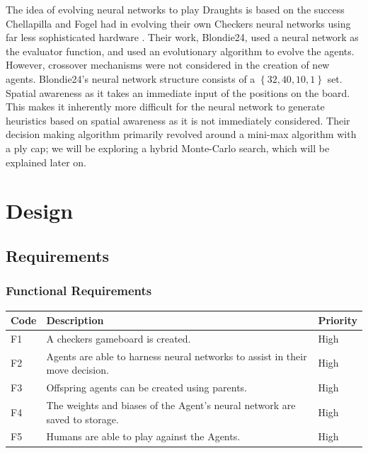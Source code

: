 \documentclass[12pt,a4paper]{article}
\begin{document}
    The idea of evolving neural networks to play Draughts is based on the success Chellapilla and Fogel had in evolving their own Checkers neural networks using far less sophisticated hardware \cite{chellapilla_evolving_1999}. Their work, Blondie24, used a neural network as the evaluator function, and used an evolutionary algorithm to evolve the agents. However, crossover mechanisms were not considered in the creation of new agents. Blondie24's neural network structure consists of a $\left\{ 32,40,10,1 \right\}$ set. Spatial awareness as it takes an immediate input of the positions on the board. This makes it inherently more difficult for the neural network to generate heuristics based on spatial awareness as it is not immediately considered. Their decision making algorithm primarily revolved around a mini-max algorithm with a ply cap; we will be exploring a hybrid Monte-Carlo search, which will be explained later on.


\section{Design}

\subsection*{Requirements}

    \subsubsection*{Functional Requirements}

    \begin{center}
        \begin{tabular}{| l  | l | l |}
        \hline
        Code & Description & Priority \\ \hline
        F1 & A checkers gameboard is created.& High  \\ \hline
        F2 &  Agents are able to harness neural networks to assist in their move decision.& High  \\ \hline
        F3 &  Offspring agents can be created using parents. & High \\ \hline
        F4 &  The weights and biases of the Agent's neural network are saved to storage.& High  \\ \hline
        F5 &  Humans are able to play against the Agents. & High \\ \hline
        \end{tabular}
    \end{center}
\end{document}
